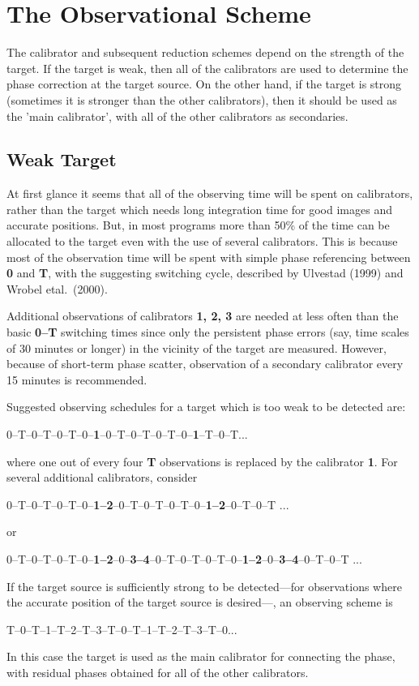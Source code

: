 \section {The Observational Scheme}

    The calibrator and subsequent reduction schemes depend on the
strength of the target.  If the target is weak, then all of the
calibrators are used to determine the phase correction at the target
source.  On the other hand, if the target is strong (sometimes it is
stronger than the other calibrators), then it should be used as the
'main calibrator', with all of the other calibrators as secondaries.

\subsection {Weak Target}

     At first glance it seems that all of the observing time will be
spent on calibrators, rather than the target which needs long integration
time for good images and accurate positions.  But, in most programs
more than 50\% of the time can be allocated to the target even with
the use of several calibrators.  This is because most of the observation
time will be spent with simple phase referencing between {\bf 0} and
{\bf T}, with the suggesting switching cycle, described by Ulvestad
(1999) and Wrobel etal.~(2000).

Additional observations of calibrators {\bf 1, 2, 3} are needed at
less often than the basic {\bf 0--T} switching times since only
the persistent phase errors (say, time scales of 30 minutes or longer)
in the vicinity of the target are measured.  However, because of
short-term phase scatter, observation of a secondary calibrator every
15 minutes is recommended.

     Suggested observing schedules for a target which is too weak to be
detected are:
\vskip 0.01cm\noindent
\centerline{0--T--0--T--0--T--0--{\bf 1}--0--T--0--T--0--T--0--{\bf 1}--T--0--T...}
\vskip 0.01cm\noindent
where one out of every four {\bf T }observations is replaced by the
calibrator {\bf 1}.  For several additional calibrators, consider
\vskip 0.01cm\noindent
\centerline{0--T--0--T--0--T--0--{\bf 1--2}--0--T--0--T--0--T--0--{\bf 1--2}--0--T--0--T ...}
or
\centerline{0--T--0--T--0--T--0--{\bf 1--2}--0--{\bf 3--4}--0--T--0--T--0--T--0--{\bf 1--2}--0--{\bf 3--4}--0--T--0--T ...}
\vskip 0.01cm\noindent
    If the target source is sufficiently strong to be detected---for
observations where the accurate position of the target source is
desired---, an observing scheme is
\vskip 0.01cm\noindent
\centerline {T--0--T--1--T--2--T--3--T--0--T--1--T--2--T--3--T--0...}
\vskip 0.01cm\noindent
In this case the target is used as the main calibrator for connecting the
phase, with residual phases obtained for all of the other calibrators.

